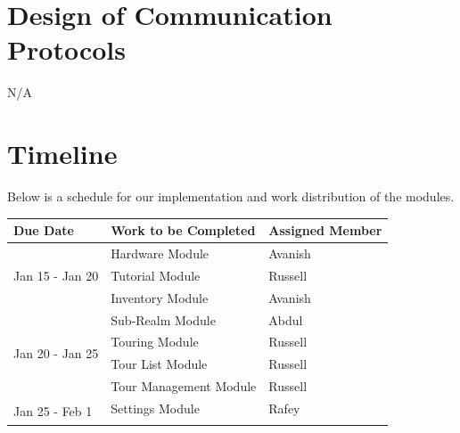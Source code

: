 \documentclass[12pt, titlepage]{article}
\begin{document}
\section{Design of Communication Protocols}

N/A

\section{Timeline}
Below is a schedule for our implementation and work distribution of the modules.

\begin{table}[H]
\begin{tabular}{lll}
\hline
\multicolumn{1}{|l|}{\textbf{Due Date}}                & \multicolumn{1}{l|}{\textbf{Work to be Completed}}            & \multicolumn{1}{l|}{\textbf{Assigned Member}} \\ \hline
\multicolumn{1}{|l|}{\multirow{3}{*}{Jan 15 - Jan 20}} & \multicolumn{1}{l|}{Hardware Module}                          & \multicolumn{1}{l|}{Avanish}                  \\ \cline{2-3} 
\multicolumn{1}{|l|}{}                                 & \multicolumn{1}{l|}{Tutorial Module}                          & \multicolumn{1}{l|}{Russell}                  \\ \cline{2-3} 
\multicolumn{1}{|l|}{}                                 & \multicolumn{1}{l|}{Inventory Module}                         & \multicolumn{1}{l|}{Avanish}                  \\ \hline
\multicolumn{1}{|l|}{\multirow{4}{*}{Jan 20 - Jan 25}} & \multicolumn{1}{l|}{Sub-Realm Module}                         & \multicolumn{1}{l|}{Abdul}                    \\ \cline{2-3} 
\multicolumn{1}{|l|}{}                                 & \multicolumn{1}{l|}{Touring Module}                           & \multicolumn{1}{l|}{Russell}                  \\ \cline{2-3} 
\multicolumn{1}{|l|}{}                                 & \multicolumn{1}{l|}{Tour List Module}                         & \multicolumn{1}{l|}{Russell}                  \\ \cline{2-3} 
\multicolumn{1}{|l|}{}                                 & \multicolumn{1}{l|}{Tour Management Module}                   & \multicolumn{1}{l|}{Russell}                  \\ \hline
\multicolumn{1}{|l|}{\multirow{4}{*}{Jan 25 - Feb 1}}  & \multicolumn{1}{l|}{Settings Module}                          & \multicolumn{1}{l|}{Rafey}                    \\ \cline{2-3} 

\end{tabular}
\end{table}
\end{document}
